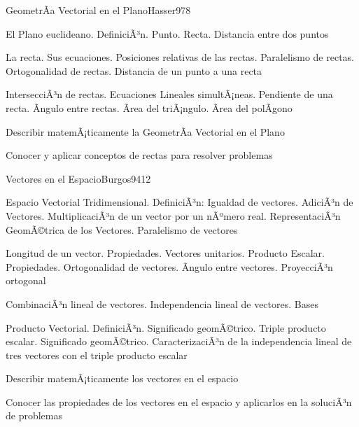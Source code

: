 \begin{syllabus}
\begin{unit}{GeometrÃ­a Vectorial en el Plano}{Hasser97}{8}
\begin{topics}
	\item El Plano euclideano. DefiniciÃ³n. Punto. Recta. Distancia entre dos puntos
	\item La recta. Sus ecuaciones. Posiciones relativas de las rectas. Paralelismo de rectas. Ortogonalidad de rectas. Distancia de un punto a una recta
      \item IntersecciÃ³n de rectas. Ecuaciones Lineales simultÃ¡neas. Pendiente de una recta. Ãngulo entre rectas. Ãrea del triÃ¡ngulo. Ãrea del polÃ­gono
\end{topics}
   \begin{unitgoals}
      \item Describir matemÃ¡ticamente la GeometrÃ­a Vectorial en el Plano
      \item Conocer y aplicar conceptos de rectas para resolver problemas
   \end{unitgoals}
\end{unit}

\begin{unit}{Vectores en el Espacio}{Burgos94}{12}
\begin{topics}
      \item Espacio Vectorial Tridimensional. DefiniciÃ³n: Igualdad de vectores. AdiciÃ³n de Vectores. MultiplicaciÃ³n de un vector por un nÃºmero real. RepresentaciÃ³n GeomÃ©trica de los Vectores. Paralelismo de vectores
      \item Longitud de un vector. Propiedades. Vectores unitarios. Producto Escalar. Propiedades. Ortogonalidad de vectores. Ãngulo entre vectores. ProyecciÃ³n ortogonal
      \item CombinaciÃ³n lineal de vectores. Independencia lineal de vectores. Bases
      \item Producto Vectorial. DefiniciÃ³n. Significado geomÃ©trico. Triple producto escalar. Significado geomÃ©trico. CaracterizaciÃ³n de la independencia lineal de tres vectores con el triple producto escalar
\end{topics}

   \begin{unitgoals}
      \item Describir matemÃ¡ticamente los vectores en el espacio
      \item Conocer las propiedades de los vectores en el espacio y aplicarlos en la soluciÃ³n de problemas
   \end{unitgoals}
\end{unit}


\end{syllabus}
